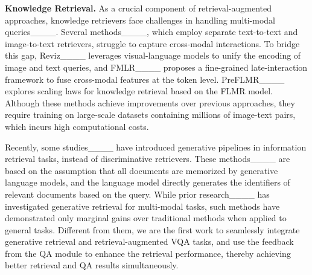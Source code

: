 \noindent \textbf{Knowledge Retrieval.} As a crucial component of retrieval-augmented approaches, knowledge retrievers face challenges in handling multi-modal queries____. Several methods____, which employ separate text-to-text and image-to-text retrievers, struggle to capture cross-modal interactions. 
To bridge this gap, Reviz____ leverages visual-language models to unify the encoding of image and text queries, and FMLR____ proposes a fine-grained late-interaction framework to fuse cross-modal features at the token level.
PreFLMR____ explores scaling laws for knowledge retrieval based on the FLMR model.
Although these methods achieve improvements over previous approaches, they require training on large-scale datasets containing millions of image-text pairs, which incurs high computational costs.

Recently, some studies____ have introduced generative pipelines in information retrieval tasks, instead of discriminative retrievers.
These methods____ are based on the assumption that all documents are memorized by generative language models, and the language model directly generates the identifiers of relevant documents based on the query.
While prior research____ has investigated generative retrieval for multi-modal tasks, such methods have demonstrated only marginal gains over traditional methods when applied to general tasks.
Different from them, we are the first work to seamlessly integrate generative retrieval and retrieval-augmented VQA tasks, and use the feedback from the QA module to enhance the retrieval performance, thereby achieving better retrieval and QA results simultaneously.

